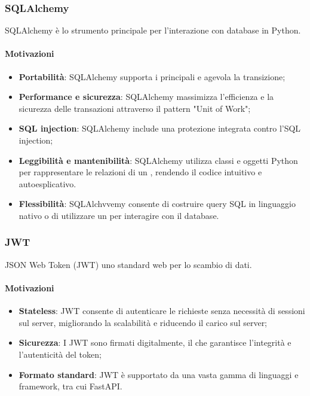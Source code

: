 \subsubsection{SQLAlchemy}\label{sec:sqlalchemy}
\par SQLAlchemy è lo strumento principale per l'interazione con database  in Python.
\paragraph*{Motivazioni}
\begin{itemize}
  \item \textbf{Portabilità}: SQLAlchemy supporta i principali  e agevola la transizione;
  \item \textbf{Performance e sicurezza}: SQLAlchemy massimizza l'efficienza e la sicurezza delle transazioni attraverso il pattern "Unit of Work";
  \item \textbf{SQL injection}: SQLAlchemy include una protezione integrata contro l'SQL injection;
  \item \textbf{Leggibilità e mantenibilità}: SQLAlchemy utilizza classi e oggetti Python per rappresentare le relazioni di un , rendendo il codice intuitivo e autoesplicativo.
  \item \textbf{Flessibilità}: SQLAlchvvemy consente di costruire query SQL in linguaggio nativo o di utilizzare un  per interagire con il database.
\end{itemize}

\subsubsection{JWT}\label{sec:jwt}
\par JSON Web Token (JWT) uno standard web per lo scambio di dati.
\paragraph*{Motivazioni}
\begin{itemize}
  \item \textbf{Stateless}: JWT consente di autenticare le richieste senza necessità di sessioni sul server, migliorando la scalabilità e riducendo il carico sul server;
  \item \textbf{Sicurezza}: I JWT sono firmati digitalmente, il che garantisce l'integrità e l'autenticità del token;
  \item \textbf{Formato standard}: JWT è supportato da una vasta gamma di linguaggi e framework, tra cui FastAPI.
\end{itemize}

